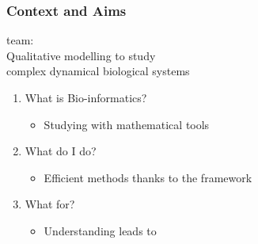 
\begin{frame}[c]
  \frametitle{Context and Aims}


\begin{center}
\Large
{} team:\large\\
Qualitative modelling to study\\
complex dynamical biological systems
\end{center}

\bigskip
\normalsize
\pause
\begin{enumerate}[1)]
  \item What is Bio-informatics?
  \begin{itemize}
    \item[] Studying  with mathematical tools
  \end{itemize}

\pause
  \smallskip
  \item What do I do?
  \begin{itemize}
    \item[] Efficient methods thanks to the  framework
  \end{itemize}

\pause
  \smallskip
  \item What for?
  \begin{itemize}
    \item[] Understanding leads to 
  \end{itemize}
\end{enumerate}

\end{frame}
